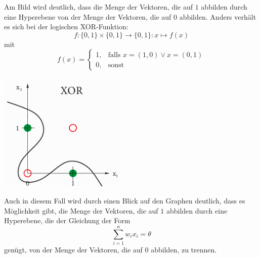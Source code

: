 \documentclass[a4paper]{scrartcl}
\newenvironment{Figure}
  {\par\medskip\noindent\minipage{\linewidth}}
  {\endminipage\par\medskip}
\begin{document}
\begin{multicols}{2}
\begin{Figure}
                        \end{Figure}
                        Am Bild wird deutlich, dass die Menge der Vektoren, die auf $1$ abbilden durch eine Hyperebene von der Menge der Vektoren, die auf $0$ abbilden.
                        \newline
                        Anders verhält es sich bei der logischen XOR-Funktion:
                        $$
                            f:\{0,1\}\times\{0,1\}\rightarrow\{0,1\}: x\mapsto f(x)
                        $$
                        mit
                        $$
                            f(x)=\left\{\begin{array}{cl} 1, & \mbox{falls }x=(1,0) \vee x = (0,1)\\
                            0, & \mbox{sonst}\end{array}\right. 
                        $$
                        \begin{Figure}
                            \centering
                            \includegraphics[width=\linewidth]{XOR.png}
                        \end{Figure}
                        Auch in diesem Fall wird durch einen Blick auf den Graphen deutlich, dass es Möglichkeit gibt, die Menge der Vektoren, die auf $1$ abbilden durch eine Hyperebene, die der Gleichung der Form
                        $$
                            \sum_{i=1}^nw_ix_i = \theta
                        $$
                        genügt, von der Menge der Vektoren, die auf $0$ abbilden, zu trennen.

\end{multicols}
\end{document}
